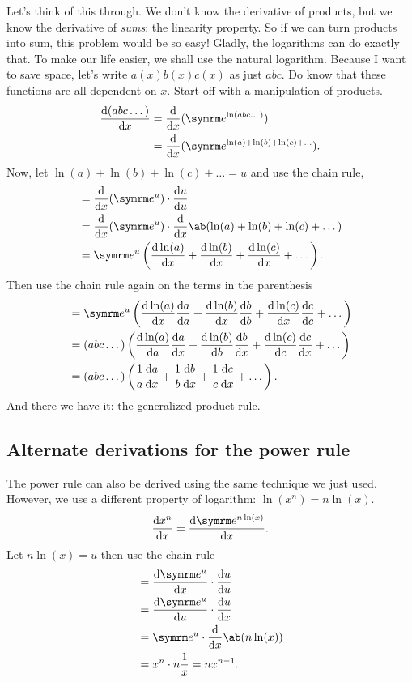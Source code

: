 Let's think of this through. We don't know the derivative of products, but we know the derivative of \emph{sums}: the linearity property. So if we can turn products into sum, this problem would be so easy! Gladly, the logarithms can do exactly that. To make our life easier, we shall use the natural logarithm. Because I want to save space, let's write $a(x)b(x)c(x)$ as just $abc$. Do know that these functions are all dependent on $x$. Start off with a manipulation of products.
\begin{align*}
    \odv{(abc\dots)}{x} &= \odv*{(\e^{\ln(abc\dots)})}{x} \\
    &= \odv*{(\e^{\ln(a) + \ln(b) + \ln(c) + \dots})}{x}.
\end{align*}
Now, let $\ln(a) + \ln(b) + \ln(c) + \dots = u$ and use the chain rule,
\begin{align*}
    &= \odv*{(\e^u)}{x} \cdot \odv{u}{u} \\
    &= \odv*{(\e^u)}{x} \cdot \odv*{\ab(\ln(a) + \ln(b) + \ln(c) + \dots)}{x} \\
    &= \e^u \left(\odv{\ln(a)}{x} + \odv{\ln(b)}{x} + \odv{\ln(c)}{x} + \dots\right).
\end{align*}
Then use the chain rule again on the terms in the parenthesis
\begin{align*}
    &= \e^u \left(\odv{\ln(a)}{x}\odv{a}{a} + \odv{\ln(b)}{x}\odv{b}{b} + \odv{\ln(c)}{x}\odv{c}{c} + \dots\right) \\
    &= (abc\dots)\left(\odv{\ln(a)}{a}\odv{a}{x} + \odv{\ln(b)}{b}\odv{b}{x} + \odv{\ln(c)}{c}\odv{c}{x} + \dots\right) \\
    &= (abc\dots)\left(\frac{1}{a}\odv{a}{x} + \frac{1}{b}\odv{b}{x} + \frac{1}{c}\odv{c}{x} + \dots\right).
\end{align*}
And there we have it: the generalized product rule.

\subsection{Alternate derivations for the power rule}

The power rule can also be derived using the same technique we just used. However, we use a different property of logarithm: $\ln(x^n) = n\ln(x)$.
\begin{equation*}
    \odv{x^n}{x} = \odv{\e^{n\ln(x)}}{x}.
\end{equation*}
Let $n\ln(x) = u$ then use the chain rule
\begin{align*}
    &= \odv{\e^u}{x} \cdot \odv{u}{u} \\
    &= \odv{\e^u}{u} \cdot \odv{u}{x} \\
    &= \e^u \cdot \odv*{\ab(n\ln(x))}{x} \\
    &= x^n \cdot n\frac{1}{x} = nx^{n - 1}.
\end{align*}

